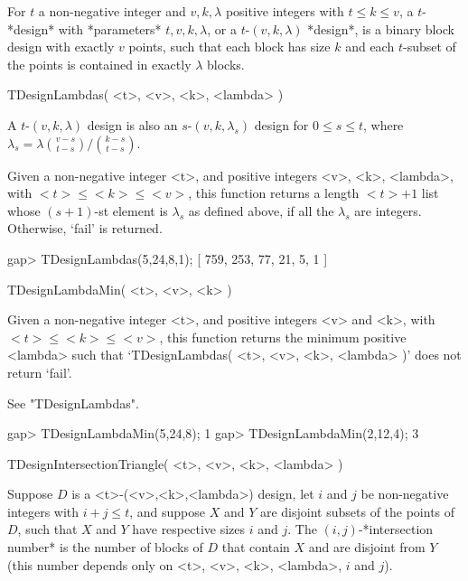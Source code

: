 %
%
%
%
\def\DESIGN{\sf DESIGN}
\def\GRAPE{\sf GRAPE}
\def\nauty{\it nauty}
\def\Aut{{\rm Aut}\,}
\def\x{\times}


For $t$ a non-negative integer and $v,k,\lambda$ positive integers with
$t\le k\le v$, a $t$-*design* with *parameters* $t,v,k,\lambda$, or a
$t$-$(v,k,\lambda)$ *design*, is a binary block design with exactly $v$
points, such that each block has size $k$ and each $t$-subset of the
points is contained in exactly $\lambda$ blocks.

\>TDesignLambdas( <t>, <v>, <k>, <lambda> )

A $t$-$(v,k,\lambda)$ design is also an $s$-$(v,k,\lambda_s)$ design
for $0\le s\le t$, where $\lambda_s=\lambda{v-s \choose t-s}/{k-s
\choose t-s}$.

Given a non-negative integer <t>, and positive integers <v>, <k>,
<lambda>, with $<t>\le <k>\le <v>$, this function returns a length
$<t>+1$ list whose $(s+1)$-st element is $\lambda_s$ as defined above,
if all the $\lambda_s$ are integers. Otherwise, `fail' is returned.

\beginexample
gap> TDesignLambdas(5,24,8,1);
[ 759, 253, 77, 21, 5, 1 ]
\endexample



\>TDesignLambdaMin( <t>, <v>, <k> )

Given a non-negative integer <t>, and positive integers <v> and <k>, with
$<t>\le <k>\le <v>$, this function returns the minimum positive <lambda>
such that `TDesignLambdas( <t>, <v>, <k>, <lambda> )' does not return
`fail'.

See "TDesignLambdas". 

\beginexample
gap> TDesignLambdaMin(5,24,8);  
1
gap> TDesignLambdaMin(2,12,4);
3
\endexample



\>TDesignIntersectionTriangle( <t>, <v>, <k>, <lambda> )

Suppose $D$ is a <t>-(<v>,<k>,<lambda>) design, let $i$ and $j$
be non-negative integers with $i+j\le t$, and suppose $X$ and $Y$
are disjoint subsets of the points of $D$, such that $X$ and $Y$ have
respective sizes $i$ and $j$. The $(i,j)$-*intersection number* is
the number of blocks of $D$ that contain $X$ and are disjoint from $Y$
(this number depends only on <t>, <v>, <k>, <lambda>, $i$ and $j$).

